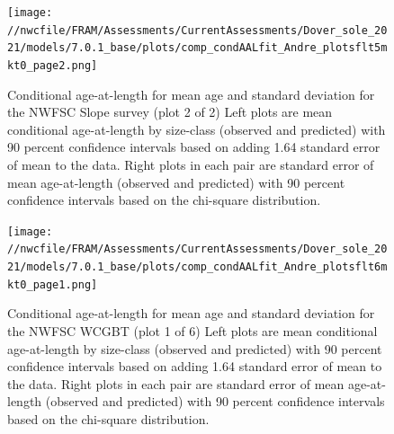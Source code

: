 \documentclass[11pt,
  english,
  a4paper,
]{article}
\begin{document}
\tagmcend\tagstructend


\begin{figure}
\centering
\texttt{[image: //nwcfile/FRAM/Assessments/CurrentAssessments/Dover\_sole\_2021/models/7.0.1\_base/plots/comp\_condAALfit\_Andre\_plotsflt5mkt0\_page2.png]}
\caption{Conditional age-at-length for mean age and standard deviation for the NWFSC Slope survey (plot 2 of 2) Left plots are mean conditional age-at-length by size-class (observed and predicted) with 90 percent confidence intervals based on adding 1.64 standard error of mean to the data. Right plots in each pair are standard error of mean age-at-length (observed and predicted) with 90 percent confidence intervals based on the chi-square distribution.\label{fig:nwslope-caal-fit-2}}
\end{figure}

\tagmcend\tagstructend


\begin{figure}
\centering
\texttt{[image: //nwcfile/FRAM/Assessments/CurrentAssessments/Dover\_sole\_2021/models/7.0.1\_base/plots/comp\_condAALfit\_Andre\_plotsflt6mkt0\_page1.png]}
\caption{Conditional age-at-length for mean age and standard deviation for the NWFSC WCGBT (plot 1 of 6) Left plots are mean conditional age-at-length by size-class (observed and predicted) with 90 percent confidence intervals based on adding 1.64 standard error of mean to the data. Right plots in each pair are standard error of mean age-at-length (observed and predicted) with 90 percent confidence intervals based on the chi-square distribution.\label{fig:wcgbt-caal-fit-1}}
\end{figure}
\end{document}
